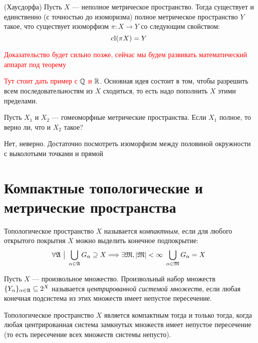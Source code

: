 \begin{theorem} (Хаусдорфа)
	Пусть $X$ --- неполное метрическое пространство. Тогда существует и единственно (с точностью до изоморизма) полное метрическое пространство $Y$ такое, что существует изоморфизм $\pi \colon X \to Y$ со следующим свойством:
	\[
		\operatorname{cl}(\pi X) = Y
	\]
\end{theorem}

\textcolor{red}{Доказательство будет сильно позже, сейчас мы будем развивать математический аппарат под теорему}

\begin{note}
	\textcolor{red}{Тут стоит дать пример с $\mathbb{Q}$ и $\mathbb{R}$}. Основная идея состоит в том, чтобы разрешить всем последовательностям из $X$ сходиться, то есть надо пополнить $X$ этими пределами.
\end{note}

\begin{exercise}
	Пусть $X_1$ и $X_2$ --- гомеоморфные метрические пространства. Если $X_1$ полное, то верно ли, что и $X_2$ такое?
\end{exercise}

\begin{solution}
	Нет, неверно. Достаточно посмотреть изоморфизм между половиной окружности с выколотыми точками и прямой
\end{solution}

\section{Компактные топологические и метрические пространства}

\begin{definition}
	Топологическое пространство $X$ называется \textit{компактным}, если для любого открытого покрытия $X$ можно выделить конечное подпокрытие:
	\[
		\forall \gA \such \bigcup_{\alpha \in \gA} G_\alpha \supseteq X \Lora \exists \gM, |\gM| < \infty\ \bigcup_{\alpha \in \gM} G_\alpha = X
	\]
\end{definition}

\begin{definition}
	Пусть $X$ --- произвольное множество. Произвольный набор множеств $\{Y_\alpha\}_{\alpha \in \mathfrak{A}} \subseteq 2^X$ называется \textit{центрированной системой множеств}, если любая конечная подсистема из этих множеств имеет непустое пересечение.
\end{definition}

\begin{theorem}
	Топологическое пространство $X$ является компактным тогда и только тогда, когда любая центрированная система замкнутых множеств имеет непустое пересечение (то есть пересечение всех множеств системы непусто).
\end{theorem}


